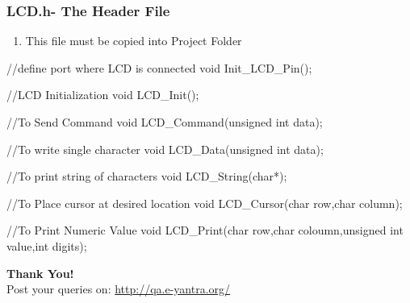 \documentclass[10pt,red]{beamer}
\begin{document}
\begin{frame}[shrink=0,fragile]
	\frametitle{LCD.h- The Header File} \pause
		  \begin{enumerate}
		    \item <+-|alert@+> This file must be copied into Project Folder  \pause \\[10pt]
		  \end{enumerate}	
		   \begin{semiverbatim}
\color{green!80} //define port where LCD is connected \color{black}
void Init_LCD_Pin();   \pause

\color{green!80} //LCD Initialization \color{black}
void LCD_Init();       \pause

\color{green!80} //To Send Command \color{black}
void LCD_Command(unsigned int data);   \pause

\color{green!80} //To write single character \color{black}
void LCD_Data(unsigned int data);	  \pause

\color{green!80} //To print string of characters \color{black}
void LCD_String(char*); 	  \pause 

\color{green!80}//To Place cursor at desired location \color{black}
void LCD_Cursor(char row,char column); \pause

\color{green!80} //To Print Numeric Value \color{black}
void LCD_Print(char row,char coloumn,unsigned int value,int digits);  \pause  
               
               
               
		   \end{semiverbatim}
\end{frame}

\begin{frame}
\hskip4cm
\textbf{\LARGE Thank You!} \\[20pt]
\hskip3cm
\scriptsize Post your queries on: 
\hyperref[www.e-yantra.org]{\color{blue} http://qa.e-yantra.org/ \color{black}} 
\end{frame}
\end{document}
